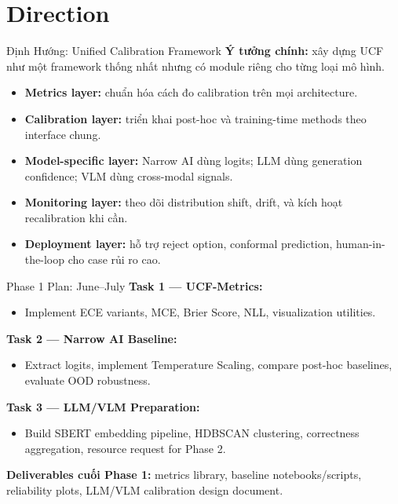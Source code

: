 \documentclass[aspectratio=169]{beamer}
\begin{document}
\section{Direction}

\begin{frame}{Định Hướng: Unified Calibration Framework}
\textbf{Ý tưởng chính:} xây dựng UCF như một framework thống nhất nhưng có module riêng cho từng loại mô hình.

\vspace{0.2cm}
\begin{itemize}
\item \textbf{Metrics layer:} chuẩn hóa cách đo calibration trên mọi architecture.
\item \textbf{Calibration layer:} triển khai post-hoc và training-time methods theo interface chung.
\item \textbf{Model-specific layer:} Narrow AI dùng logits; LLM dùng generation confidence; VLM dùng cross-modal signals.
\item \textbf{Monitoring layer:} theo dõi distribution shift, drift, và kích hoạt recalibration khi cần.
\item \textbf{Deployment layer:} hỗ trợ reject option, conformal prediction, human-in-the-loop cho case rủi ro cao.
\end{itemize}
\end{frame}

\begin{frame}{Phase 1 Plan: June--July}
\textbf{Task 1 --- UCF-Metrics:}
\begin{itemize}
\item Implement ECE variants, MCE, Brier Score, NLL, visualization utilities.
\end{itemize}

\textbf{Task 2 --- Narrow AI Baseline:}
\begin{itemize}
\item Extract logits, implement Temperature Scaling, compare post-hoc baselines, evaluate OOD robustness.
\end{itemize}

\textbf{Task 3 --- LLM/VLM Preparation:}
\begin{itemize}
\item Build SBERT embedding pipeline, HDBSCAN clustering, correctness aggregation, resource request for Phase 2.
\end{itemize}

\vspace{0.2cm}
\textbf{Deliverables cuối Phase 1:} metrics library, baseline notebooks/scripts, reliability plots, LLM/VLM calibration design document.
\end{frame}
\end{document}
